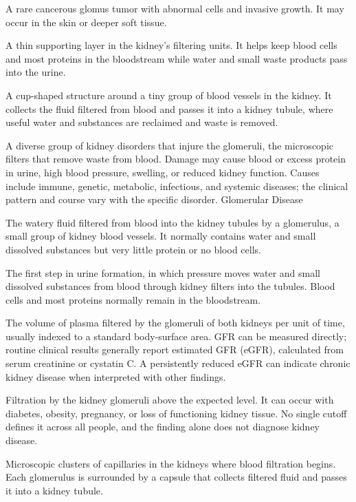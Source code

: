 A rare cancerous glomus tumor with abnormal cells and invasive growth. It may occur in the skin or deeper soft tissue.

 A thin supporting layer in the kidney’s filtering units. It helps keep blood cells and most proteins in the bloodstream while water and small waste products pass into the urine.

 A cup-shaped structure around a tiny group of blood vessels in the kidney. It collects the fluid filtered from blood and passes it into a kidney tubule, where useful water and substances are reclaimed and waste is removed.

 A diverse group of kidney disorders that injure the glomeruli, the microscopic filters that remove waste from blood.
Damage may cause blood or excess protein in urine, high blood pressure, swelling, or reduced kidney function.
Causes include immune, genetic, metabolic, infectious, and systemic diseases; the clinical pattern and
course vary with the specific disorder.
\synonyms
Glomerular Disease

 The watery fluid filtered from blood into the kidney tubules by a glomerulus, a small group of kidney blood vessels. It normally contains water and small dissolved substances but very little protein or no blood cells.

 The first step in urine formation, in which pressure moves water and small dissolved substances from blood through kidney filters into the tubules. Blood cells and most proteins normally remain in the bloodstream.

 The volume of plasma filtered by the glomeruli of both kidneys per unit of time, usually indexed to a standard body-surface area.
GFR can be measured directly; routine clinical results generally report estimated GFR (eGFR), calculated from serum creatinine or cystatin C.
A persistently reduced eGFR can indicate chronic kidney disease when interpreted with other findings.

 Filtration by the kidney glomeruli above the expected level. It can occur with diabetes, obesity, pregnancy, or loss of functioning kidney tissue. No single cutoff defines it across all people, and the finding alone does not diagnose kidney disease.

 Microscopic clusters of capillaries in the kidneys where blood filtration begins. Each glomerulus is surrounded by a capsule that collects filtered fluid and passes it into a kidney tubule.

